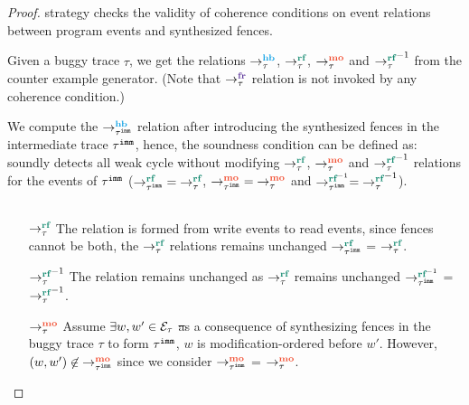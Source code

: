 { 
	\label{lem:weak-sound}}
\begin{proof}
	\wkfence strategy checks the validity of coherence conditions
	on event relations between program events and synthesized
	fences.
	
	Given a buggy trace $\tau$, we get the relations $\setHB$,
	$\setRF$, $\setMO$ and $\setRF^{-1}$ from the counter
	example generator.
	(Note that $\setFR$ relation is not invoked by any 
	coherence condition.)
	
	We compute the $\hb{\imm{\tau}}{}{}$ relation after introducing 
	the synthesized fences in the intermediate trace ${\tau}^{\mathtt{imm}}$, 
	hence, the soundness condition can be defined as: 
	\ourtechnique soundly detects all weak cycle without modifying 
	$\setRF$, $\setMO$ and $\setRF^{-1}$ relations for the events of 
	${\tau}^{\mathtt{imm}}$ (\ie $\rf{\imm{\tau}}{}{} = \setRF$, 
	$\mo{\imm{\tau}}{}{} = \setMO$ and $\rfinv{\imm{\tau}}{}{} = 
	\setRF^{-1}$).
	
	\begin{figure}[h]
		\begin{tabular}{|c|c|c|c|}
			\hline
			\resizebox{0.19\textwidth}{!}{} &
			\resizebox{0.25\textwidth}{!}{} &
			\resizebox{0.25\textwidth}{!}{} &
			\resizebox{0.27\textwidth}{!}{} \\
			\hline
		\end{tabular}
		\label{fig:como}
	\end{figure}
	
	
	\begin{itemize}[label=setmm,align=left,leftmargin=*]
		\item [$\setRF$] The relation is formed from write events 
			to read events, since fences cannot be both, the $\setRF$
			relations remains unchanged \ie $\rf{\imm{\tau}}{}{}$ =
			$\setRF$.
		
		\item [$\setRF^{-1}$] The relation remains unchanged as 
			$\setRF$ remains unchanged \ie $\rfinv{\imm{\tau}}{}{}$ 
			= $\setRF^{-1}$.
		
		\item [$\setMO$] Assume $\exists w, w' \in \mathcal{E}_\tau$ \st 
			as a consequence of synthesizing fences in the buggy trace 
			$\tau$ to form ${\tau}^{\mathtt{imm}}$, $w$ is modification-ordered
			before $w'$. However, $(w,w') \nin \mo{\imm{\tau}}{}{}$
			since we consider $\mo{\imm{\tau}}{}{}$ = $\setMO$.
			

\end{itemize}
\end{proof}
